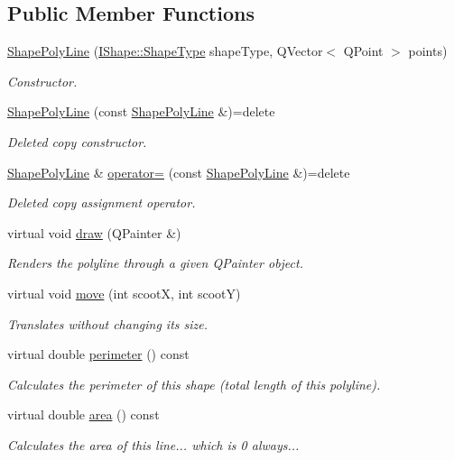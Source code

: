 \subsection*{Public Member Functions}
\begin{DoxyCompactItemize}
\item 
\mbox{\hyperlink{class_shape_poly_line_ad791dac03e16988066b2e8e074fed381}{Shape\+Poly\+Line}} (\mbox{\hyperlink{class_i_shape_a8f50993477b5ddb44c0547ef3d547cdc}{I\+Shape\+::\+Shape\+Type}} shape\+Type, Q\+Vector$<$ Q\+Point $>$ points)
\begin{DoxyCompactList}\small\item\em Constructor. \end{DoxyCompactList}\item 
\mbox{\hyperlink{class_shape_poly_line_a86ba6279c0c0fae57568d7696442c271}{Shape\+Poly\+Line}} (const \mbox{\hyperlink{class_shape_poly_line}{Shape\+Poly\+Line}} \&)=delete
\begin{DoxyCompactList}\small\item\em Deleted copy constructor. \end{DoxyCompactList}\item 
\mbox{\hyperlink{class_shape_poly_line}{Shape\+Poly\+Line}} \& \mbox{\hyperlink{class_shape_poly_line_a57631de758dda4361bc5c8317ae88a85}{operator=}} (const \mbox{\hyperlink{class_shape_poly_line}{Shape\+Poly\+Line}} \&)=delete
\begin{DoxyCompactList}\small\item\em Deleted copy assignment operator. \end{DoxyCompactList}\item 
virtual void \mbox{\hyperlink{class_shape_poly_line_a6aaca4bd2767644f9ea0f68065fa1f98}{draw}} (Q\+Painter \&)
\begin{DoxyCompactList}\small\item\em Renders the polyline through a given Q\+Painter object. \end{DoxyCompactList}\item 
virtual void \mbox{\hyperlink{class_shape_poly_line_a7c1971596b171c4c08ec5657b6592354}{move}} (int scootX, int scootY)
\begin{DoxyCompactList}\small\item\em Translates without changing its size. \end{DoxyCompactList}\item 
virtual double \mbox{\hyperlink{class_shape_poly_line_a3d6664ada9c9dd883303a3dcb63d6188}{perimeter}} () const
\begin{DoxyCompactList}\small\item\em Calculates the perimeter of this shape (total length of this polyline). \end{DoxyCompactList}\item 
virtual double \mbox{\hyperlink{class_shape_poly_line_ace9d3c1eefec00364034dc420262c91e}{area}} () const
\begin{DoxyCompactList}\small\item\em Calculates the area of this line... which is 0 always... \end{DoxyCompactList}\end{DoxyCompactItemize}
